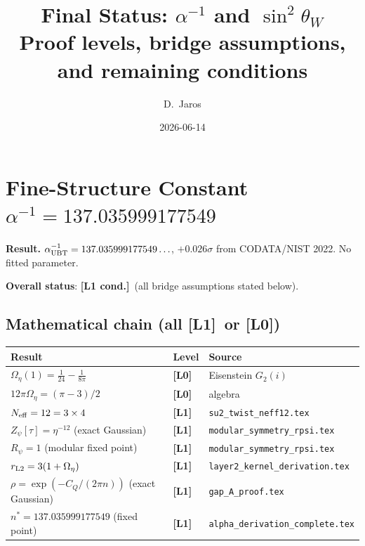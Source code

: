 \documentclass[12pt,a4paper]{article}
\title{\textbf{Final Status: $\alpha^{-1}$ and $\sin^2\theta_W$}\\[4pt]
\large Proof levels, bridge assumptions, and remaining conditions}
\author{D.~Jaros}
\date{2026-06-14}
\theoremstyle{remark}\newtheorem{remark}[theorem]{Remark}
\newcommand{\Lz}{\textbf{[L0]}}
\newcommand{\Lo}{\textbf{[L1]}}
\newcommand{\Lc}{\textbf{[L1 cond.]}}
\begin{document}
\maketitle
\fi

\section{Fine-Structure Constant $\alpha^{-1} = 137.035999177549$}
\label{sec:alpha}

\begin{resultbox}
\textbf{Result.}
$\alpha^{-1}_{\rm UBT} = 137.035999177549\ldots$,
$+0.026\sigma$ from CODATA/NIST 2022. No fitted parameter.

\textbf{Overall status}: \Lc\ (all bridge assumptions stated below).
\end{resultbox}

\subsection{Mathematical chain (all \Lo\ or \Lz)}

\begin{center}
\renewcommand{\arraystretch}{1.25}
\begin{tabular}{lll}
\toprule
Result & Level & Source \\
\midrule
$\Omega_\eta(1)=\tfrac{1}{24}-\tfrac{1}{8\pi}$ & \Lz & Eisenstein $G_2(i)$ \\
$12\pi\Omega_\eta = (\pi-3)/2$ & \Lz & algebra \\
$N_{\rm eff}=12=3\times4$ & \Lo & \texttt{su2\_twist\_neff12.tex} \\
$Z_\psi[\tau]=\eta^{-12}$ (exact Gaussian) & \Lo & \texttt{modular\_symmetry\_rpsi.tex} \\
$R_\psi=1$ (modular fixed point) & \Lo & \texttt{modular\_symmetry\_rpsi.tex} \\
$r_{\rm L2}=3(1+\Omega_\eta)$ & \Lo & \texttt{layer2\_kernel\_derivation.tex} \\
$\rho=\exp(-C_Q/(2\pi n))$ (exact Gaussian) & \Lo & \texttt{gap\_A\_proof.tex} \\
$n^*=137.035999177549$ (fixed point) & \Lo & \texttt{alpha\_derivation\_complete.tex} \\
\bottomrule
\end{tabular}
\end{center}
\end{document}
